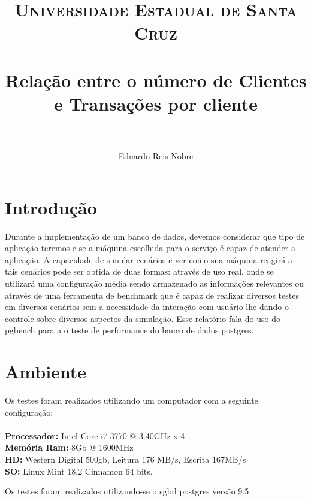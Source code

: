 \documentclass[12pt, a4paper, twoside, titlepage]{article}
\title{
		\normalfont \normalsize \textsc{Universidade Estadual de Santa Cruz} \\ [25pt]
		\horrule{0.5pt} \\[0.4cm]
		\huge Relação entre o número de Clientes e Transações por cliente\\
		\horrule{2pt} \\[0.5cm]
}
\author{
	\normalfont 								\normalsize
	Eduardo Reis Nobre\\[-3pt]		\normalsize
}
\begin{document}
\maketitle



\tableofcontents %
\clearpage

\section{Introdução}
Durante a implementação de um banco de dados, devemos considerar que tipo de aplicação teremos e se a máquina escolhida para o serviço é capaz de atender a aplicação. A capacidade de simular cenários e ver como sua máquina reagirá a tais cenários pode ser obtida de duas formas: através de uso real, onde se utilizará uma configuração média sendo armazenado as informações relevantes ou através de uma ferramenta de benchmark que é capaz de realizar diversos testes em diversos cenários sem a necessidade da interação com usuário lhe dando o controle sobre diversos aspectos da simulação. Esse relatório fala do uso do pgbench para a o teste de performance do banco de dados postgres.
\section{Ambiente}
Os testes foram realizados utilizando um computador com a seguinte configuração:\\\\
\textbf{\textbf{}Processador:} Intel Core i7 3770 @ 3.40GHz x 4\\
\textbf{\textbf{}Memória Ram:} 8Gb @ 1600MHz\\
\textbf{HD:} Western Digital 500gb, Leitura 176 MB/s, Escrita 167MB/s\\
\textbf{SO:} Linux Mint 18.2 Cinnamon 64 bits.

Os testes foram realizados utilizando-se o sgbd postgres versão 9.5.
\end{document}
